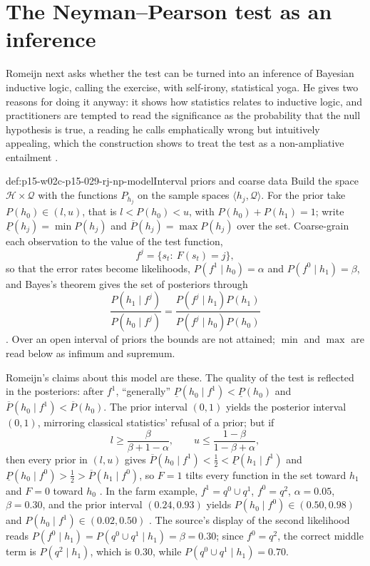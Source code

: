 \section{The Neyman--Pearson test as an inference}
\label{sec:p15-w02c-p15-029-rj-np-inference}

Romeijn next asks whether the test can be turned into an inference of
Bayesian inductive logic, calling the exercise, with self-irony,
statistical yoga. He gives two reasons for doing it anyway: it shows how
statistics relates to inductive logic, and practitioners are tempted
to read the significance as the probability that the null hypothesis
is true, a reading he calls emphatically wrong but intuitively
appealing, which the construction shows to treat the test as a
non-ampliative entailment \cite[p.~640]{Romeijn2011InductiveLogicStatistics}.

\begin{hbdefinition}{def:p15-w02c-p15-029-rj-np-model}{Interval priors and coarse data}
Build the space \(\mathcal H\times\mathcal Q\) with the functions
\(P_{h_j}\) on the sample spaces \(\langle h_j,\mathcal Q\rangle\). For
the prior take \(P(h_0)\in(l,u)\), that is \(l<P(h_0)<u\), with
\(P(h_0)+P(h_1)=1\); write \(\underline P(h_j)=\min P(h_j)\) and
\(\overline P(h_j)=\max P(h_j)\) over the set. Coarse-grain each
observation to the value of the test function,
\[
 f^j=\{s_t:\ F(s_t)=j\},
\]
so that the error rates become likelihoods,
\(P(f^1\mid h_0)=\alpha\) and \(P(f^0\mid h_1)=\beta\), and Bayes's
theorem gives the set of posteriors through
\[
 \frac{P(h_1\mid f^j)}{P(h_0\mid f^j)}=\frac{P(f^j\mid h_1)P(h_1)}{P(f^j\mid h_0)P(h_0)}
\]
\cite[pp.~640--641]{Romeijn2011InductiveLogicStatistics}. Over an open
interval of priors the bounds are not attained; \(\min\) and \(\max\)
are read below as infimum and supremum.
\end{hbdefinition}

Romeijn's claims about this model are these. The quality of the test is
reflected in the posteriors: after \(f^1\), ``generally''
\(\underline P(h_0\mid f^1)<\underline P(h_0)\) and
\(\overline P(h_0\mid f^1)<\overline P(h_0)\). The prior interval
\((0,1)\) yields the posterior interval \((0,1)\), mirroring classical
statistics' refusal of a prior; but if
\[
 l\ge\frac{\beta}{\beta+1-\alpha},\qquad u\le\frac{1-\beta}{1-\beta+\alpha},
\]
then every prior in \((l,u)\) gives
\(\overline P(h_0\mid f^1)<\tfrac12<\underline P(h_1\mid f^1)\) and
\(\underline P(h_0\mid f^0)>\tfrac12>\overline P(h_1\mid f^0)\), so
\(F=1\) tilts every function in the set toward \(h_1\) and \(F=0\)
toward \(h_0\) \cite[p.~641]{Romeijn2011InductiveLogicStatistics}. In
the farm example, \(f^1=q^0\cup q^1\), \(f^0=q^2\), \(\alpha=0.05\),
\(\beta=0.30\), and the prior interval \((0.24,0.93)\) yields
\(P(h_0\mid f^0)\in(0.50,0.98)\) and \(P(h_0\mid f^1)\in(0.02,0.50)\)
\cite[p.~641]{Romeijn2011InductiveLogicStatistics}. The source's display
of the second likelihood reads
\(P(f^0\mid h_1)=P(q^0\cup q^1\mid h_1)=\beta=0.30\); since \(f^0=q^2\),
the correct middle term is \(P(q^2\mid h_1)\), which is \(0.30\), while
\(P(q^0\cup q^1\mid h_1)=0.70\).

